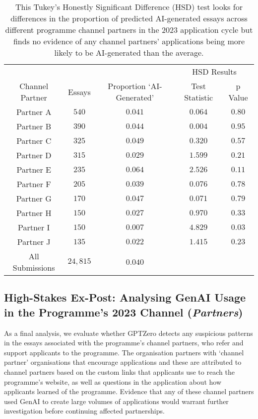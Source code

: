 \begin{table}[htb]
    \centering
    \caption{This Tukey's Honestly Significant Difference (HSD) test looks for differences in the proportion of predicted AI-generated essays across different programme channel partners in the 2023 application cycle but finds no evidence of any channel partners' applications being more likely to be AI-generated than the average.}
    \label{tab:c3_partner_anova}
    \begin{tabular}{ c c c c c }
        \toprule
        \multicolumn{3}{c}{} & \multicolumn{2}{c}{HSD Results} \\
        \cmidrule(lr){4-5}
        Channel Partner & Essays & Proportion `AI-Generated' & Test Statistic & p Value \\
        \midrule
        Partner A & $540$ & $0.041$ & $0.064$ & $0.80$ \\
        Partner B & $390$ & $0.044$ & $0.004$ & $0.95$ \\
        Partner C & $325$ & $0.049$ & $0.320$ & $0.57$ \\
        Partner D & $315$ & $0.029$ & $1.599$ & $0.21$ \\
        Partner E & $235$ & $0.064$ & $2.526$ & $0.11$ \\
        Partner F & $205$ & $0.039$ & $0.076$ & $0.78$ \\
        Partner G & $170$ & $0.047$ & $0.071$ & $0.79$ \\
        Partner H & $150$ & $0.027$ & $0.970$ & $0.33$ \\
        Partner I & $150$ & $0.007$ & $\mathbf{4.829}$ & $\mathbf{0.03}$ \\
        Partner J & $135$ & $0.022$ & $1.415$ & $0.23$ \\
        \midrule
        All Submissions & $24,815$ & $0.040$ & \\
        \bottomrule
    \end{tabular}
\end{table}

\subsection{High-Stakes Ex-Post: Analysing GenAI Usage in the Programme's 2023 Channel (\emph{Partners})}
As a final analysis, we evaluate whether GPTZero detects any suspicious patterns in the essays associated with the programme's channel partners, who refer and support applicants to the programme. The organisation partners with `channel partner' organisations that encourage applications and these are attributed to channel partners based on the custom links that applicants use to reach the programme's website, as well as questions in the application about how applicants learned of the programme. Evidence that any of these channel partners used GenAI to create large volumes of applications would warrant further investigation before continuing affected partnerships. 


